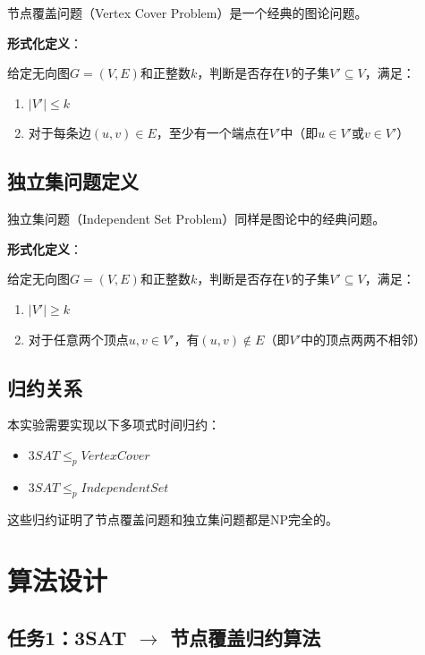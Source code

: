 \documentclass{sysucseexp}
\begin{document}
节点覆盖问题（Vertex Cover Problem）是一个经典的图论问题。

\textbf{形式化定义}：

给定无向图$G = (V, E)$和正整数$k$，判断是否存在$V$的子集$V' \subseteq V$，满足：
\begin{enumerate}
    \item $|V'| \leq k$
    \item 对于每条边$(u, v) \in E$，至少有一个端点在$V'$中（即$u \in V'$或$v \in V'$）
\end{enumerate}

\subsection{独立集问题定义}

独立集问题（Independent Set Problem）同样是图论中的经典问题。

\textbf{形式化定义}：

给定无向图$G = (V, E)$和正整数$k$，判断是否存在$V$的子集$V' \subseteq V$，满足：
\begin{enumerate}
    \item $|V'| \geq k$
    \item 对于任意两个顶点$u, v \in V'$，有$(u, v) \notin E$（即$V'$中的顶点两两不相邻）
\end{enumerate}

\subsection{归约关系}

本实验需要实现以下多项式时间归约：
\begin{itemize}
    \item $3SAT \leq_p VertexCover$
    \item $3SAT \leq_p IndependentSet$
\end{itemize}

这些归约证明了节点覆盖问题和独立集问题都是NP完全的。


\section{算法设计}

\subsection{任务1：3SAT $\to$ 节点覆盖归约算法}
\end{document}
